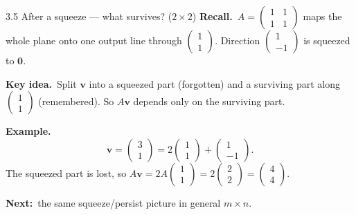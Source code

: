 \documentclass[11pt,aspectratio=169]{beamer}
\begin{document}
\begin{frame}{3.5 After a squeeze --- what survives? ($2\times 2$)}
  \footnotesize
  \textbf{Recall.}\
  $A=\begin{pmatrix}1&1\\ 1&1\end{pmatrix}$ maps the whole plane onto one output line
  through $\begin{pmatrix}1\\ 1\end{pmatrix}$.
  Direction $\begin{pmatrix}1\\ -1\end{pmatrix}$ is squeezed to $\mathbf{0}$.

  \medskip
  \textbf{Key idea.}\
  Split $\mathbf{v}$ into a squeezed part (forgotten) and a surviving part along
  $\begin{pmatrix}1\\ 1\end{pmatrix}$ (remembered).
  So $A\mathbf{v}$ depends only on the surviving part.

  \medskip
  \textbf{Example.}\
  \[
    \mathbf{v}=\begin{pmatrix}3\\ 1\end{pmatrix}
    =2\begin{pmatrix}1\\ 1\end{pmatrix}
    +\begin{pmatrix}1\\ -1\end{pmatrix}.
  \]
  The squeezed part is lost, so
  $A\mathbf{v}=2A\begin{pmatrix}1\\ 1\end{pmatrix}=2\begin{pmatrix}2\\ 2\end{pmatrix}=\begin{pmatrix}4\\ 4\end{pmatrix}$.

  \medskip
  \textbf{Next:}\ the same squeeze/persist picture in general $m\times n$.
\end{frame}
\end{document}
